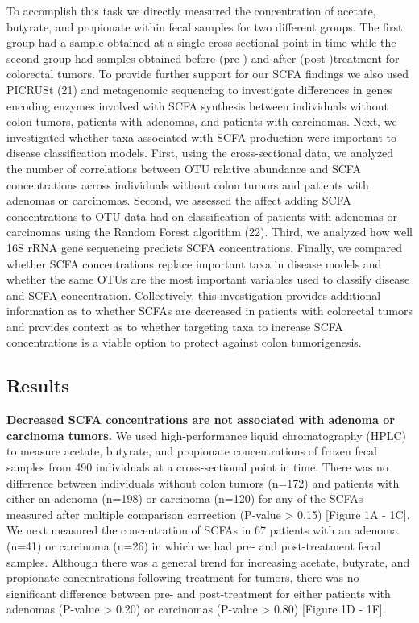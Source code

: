\documentclass[11pt,]{article}
\begin{document}
To accomplish this task we directly measured the concentration of
acetate, butyrate, and propionate within fecal samples for two different
groups. The first group had a sample obtained at a single cross
sectional point in time while the second group had samples obtained
before (pre-) and after (post-)treatment for colorectal tumors. To
provide further support for our SCFA findings we also used PICRUSt (21)
and metagenomic sequencing to investigate differences in genes encoding
enzymes involved with SCFA synthesis between individuals without colon
tumors, patients with adenomas, and patients with carcinomas. Next, we
investigated whether taxa associated with SCFA production were important
to disease classification models. First, using the cross-sectional data,
we analyzed the number of correlations between OTU relative abundance
and SCFA concentrations across individuals without colon tumors and
patients with adenomas or carcinomas. Second, we assessed the affect
adding SCFA concentrations to OTU data had on classification of patients
with adenomas or carcinomas using the Random Forest algorithm (22).
Third, we analyzed how well 16S rRNA gene sequencing predicts SCFA
concentrations. Finally, we compared whether SCFA concentrations replace
important taxa in disease models and whether the same OTUs are the most
important variables used to classify disease and SCFA concentration.
Collectively, this investigation provides additional information as to
whether SCFAs are decreased in patients with colorectal tumors and
provides context as to whether targeting taxa to increase SCFA
concentrations is a viable option to protect against colon
tumorigenesis.

\newpage

\subsection{Results}\label{results}

\textbf{Decreased SCFA concentrations are not associated with adenoma or
carcinoma tumors.} We used high-performance liquid chromatography (HPLC)
to measure acetate, butyrate, and propionate concentrations of frozen
fecal samples from 490 individuals at a cross-sectional point in time.
There was no difference between individuals without colon tumors (n=172)
and patients with either an adenoma (n=198) or carcinoma (n=120) for any
of the SCFAs measured after multiple comparison correction (P-value
\textgreater{} 0.15) {[}Figure 1A - 1C{]}. We next measured the
concentration of SCFAs in 67 patients with an adenoma (n=41) or
carcinoma (n=26) in which we had pre- and post-treatment fecal samples.
Although there was a general trend for increasing acetate, butyrate, and
propionate concentrations following treatment for tumors, there was no
significant difference between pre- and post-treatment for either
patients with adenomas (P-value \textgreater{} 0.20) or carcinomas
(P-value \textgreater{} 0.80) {[}Figure 1D - 1F{]}.
\end{document}

